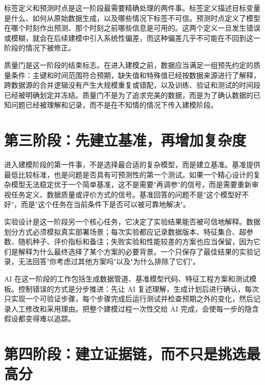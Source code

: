 标签定义和预测时点是这一阶段最需要精确处理的两件事。标签定义描述目标变量是什么、如何从原始数据生成，以及哪些情况下标签不可信。预测时点定义了模型在哪个时刻作出预测、那个时刻之前哪些信息是可用的。这两个定义一旦发生错误或模糊，就会在后续建模中引入系统性偏差，而这种偏差几乎不可能在不回到这一阶段的情况下被修正。

质量门是这一阶段的结束标志。在进入建模之前，数据应当满足一组预先约定的质量条件：主键和时间范围符合预期，缺失值和特殊值已经按数据来源进行了解释，跨数据源的合并逻辑没有产生大规模重复或错配，以及训练、验证和测试的时间段已经被明确划定并冻结。质量门不是为了追求完美的数据，而是为了确认数据的已知问题已经被理解和记录，而不是在不知情的情况下传入建模阶段。

\section{第三阶段：先建立基准，再增加复杂度}

进入建模阶段的第一件事，不是选择最合适的复杂模型，而是建立基准。基准提供最低比较标准，也是问题是否具有可预测性的第一个测试。如果一个精心设计的复杂模型无法稳定优于一个简单基准，这不是需要"再调参"的信号，而是需要重新审视任务定义、数据质量或评价方式的信号。基准回答的问题不是"这个模型好不好"，而是"这个任务在当前条件下是否可以被可靠地解决"。

实验设计是这一阶段另一个核心任务，它决定了实验结果能否被可信地解释。数据划分方式必须模拟真实部署场景；每次实验都应记录数据版本、特征集合、超参数、随机种子、评价指标和备注；失败实验和性能较差的方案也应当保留，因为它们是解释为什么最终选择了某个方案的必要背景。一个只保存了最佳结果的实验记录，无法回答"你考虑过其他方案吗"以及"为什么排除了它们"。

AI 在这一阶段的工作包括生成数据管道、基准模型代码、特征工程方案和测试模板。控制错误的方式是分步推进：先让 AI 复述理解，生成计划后进行确认，每次只实现一个可验证步骤，每个步骤完成后运行测试并检查预期之外的变化，然后记录人工修改和采用理由。把整个建模过程一次性交给 AI 完成，会使每一步的隐含假设都变得难以追踪。

\section{第四阶段：建立证据链，而不只是挑选最高分}

